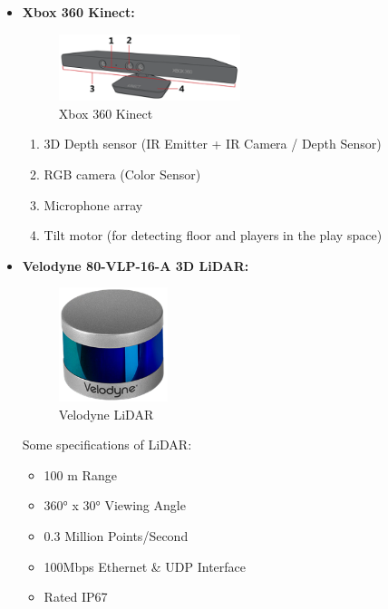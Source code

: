\documentclass[12pt]{article}
\begin{document}
\begin{itemize}
    \item \textbf{Xbox 360 Kinect:} \\
          \begin{figure}[H]
              \centering
              \includegraphics[width=0.5\textwidth]{XBoxKinect.png}
              \caption{Xbox 360 Kinect~\cite{XboxKinect}}
          \end{figure}

          \begin{enumerate}
              \item 3D Depth sensor (IR Emitter + IR Camera / Depth Sensor)
              \item RGB camera (Color Sensor)
              \item Microphone array
              \item Tilt motor (for detecting floor and players in the play space)
          \end{enumerate}

    \item \textbf{Velodyne 80-VLP-16-A 3D LiDAR:} \\
          \begin{figure}[H]
              \centering
              \includegraphics[width=0.3\textwidth]{LiDAR.png}
              \caption{Velodyne LiDAR}
          \end{figure}

          Some specifications of LiDAR:

          \begin{itemize}
              \item 100 m Range
              \item 360° x 30° Viewing Angle
              \item 0.3 Million Points/Second
              \item 100Mbps Ethernet \& UDP Interface
              \item Rated IP67
          \end{itemize}
\end{itemize}
\end{document}
